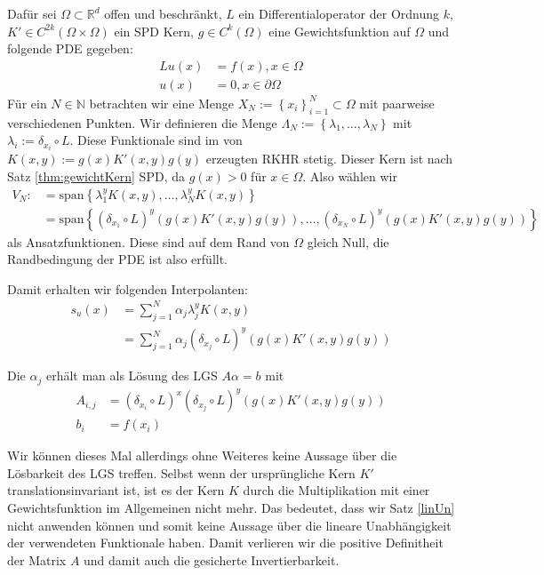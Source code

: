 Dafür sei $\Omega \subset \mathbb{R}^d$ offen und beschränkt, $L$ ein Differentialoperator der Ordnung $k$, $K' \in C^{2k}(\Omega \times \Omega)$ ein \ac{SPD} Kern, $g \in C^k(\Omega)$ eine Gewichtsfunktion auf $\Omega$ und folgende \ac{PDE} gegeben:
\begin{align*}
Lu(x) &= f(x), x \in \Omega\\
u(x) &= 0 , x \in \partial \Omega
\end{align*}
Für ein $N \in \mathbb{N}$ betrachten wir eine Menge $X_N := \left\{ x_i \right\}_{i=1}^N \subset \Omega$ mit paarweise verschiedenen Punkten. Wir definieren die Menge $\Lambda_N := \left\{ \lambda_1, \dots, \lambda_N\right\}$ mit $\lambda_i :=  \delta_{x_i} \circ L$. Diese Funktionale sind im von \\$K(x,y) := g(x) K'(x,y) g(y)$ erzeugten \ac{RKHR} stetig. Dieser Kern ist nach Satz \ref{thm:gewichtKern} \ac{SPD}, da $g(x) > 0$ für $x \in \Omega$. Also wählen wir 
\begin{align*}
V_N :&= \text{span} \left\{\lambda_1^y K(x,y), \dots, \lambda_N^y K(x,y)\right\}\\
&= \text{span} \left\{(\delta_{x_1} \circ L)^y (g(x) K'(x,y) g(y)), \dots, (\delta_{x_N} \circ L)^y (g(x) K'(x,y) g(y))\right\}
\end{align*}
als Ansatzfunktionen. Diese sind auf dem Rand von $\Omega$ gleich Null, die Randbedingung der \gls{PDE} ist also erfüllt.

Damit erhalten wir folgenden Interpolanten:
\begin{align*}
s_u(x) &= \sum_{j=1}^N \alpha_j \lambda_j^y K(x,y)\\
&= \sum_{j=1}^N \alpha_j (\delta_{x_j} \circ L)^y( g(x)K'(x,y)g(y))
\end{align*}

Die $\alpha_j$ erhält man als Lösung des \ac{LGS} $A\alpha = b$ mit 
\begin{align*}
A_{i,j} &= (\delta_{x_i} \circ L)^x (\delta_{x_j} \circ L)^y (g(x)K'(x,y)g(y))\\
b_i &= f(x_i)
\end{align*}

Wir können dieses Mal allerdings ohne Weiteres keine Aussage über die Lösbarkeit des \ac{LGS} treffen. Selbst wenn der ursprüngliche Kern $K'$ translationsinvariant ist, ist es der Kern $K$ durch die Multiplikation mit einer Gewichtsfunktion im Allgemeinen nicht mehr. Das bedeutet, dass wir Satz \ref{linUn} nicht anwenden können und somit keine Aussage über die lineare Unabhängigkeit der verwendeten Funktionale haben. Damit verlieren wir die positive Definitheit der Matrix $A$ und damit auch die gesicherte Invertierbarkeit.
